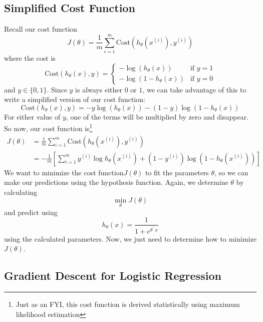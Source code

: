 \subsection{Simplified Cost Function}
Recall our cost function 
\begin{equation}
J\left(\theta\right) = \frac{1}{m} \sum_{i=1}^m \text{Cost}\left(	h_\theta\left(x^{\left(i\right)}\right), y^{\left(i\right)}\right)
\end{equation}
where the cost is 
\begin{equation}
\text{Cost}\left(h_\theta\left(x\right), y\right) = \begin{cases} -\log\left(h_\theta\left(x\right)\right) & \text{if } y = 1 \\ -\log\left(1 - h_\theta\left(x\right)\right) &\text{if } y = 0
\end{cases}
\end{equation}
and $y \in \{0, 1\}$. 
Since $y$ is always either $0$ or $1$, we can take advantage of this to write a simplified version of our cost function:
\begin{equation}
\text{Cost}\left(h_\theta\left(x\right), y\right) = -y\log\left(h_\theta\left(x\right)\right) - \left( 1-y \right) \log\left(1 - h_\theta\left(x\right)\right)
\end{equation}
For either value of $y$, one of the terms will be multiplied by zero and disappear. So now, our cost function is\footnote{Just as an FYI, this cost function is derived statistically using maximum likelihood estimation}
\begin{align}
J\left(\theta\right) &= \frac{1}{m} \sum_{i=1}^m \text{Cost}\left(	h_\theta\left(x^{\left(i\right)}\right), y^{\left(i\right)}\right) \nonumber \\
\label{chaplogreg-sectsimpcostfunct-simpcostfuncformula}
&= -\frac{1}{m} \left[ \sum_{i=1}^m y^{\left(i\right)} \log h_\theta\left(x^{\left(i\right)}\right) + \left(1 - y^{\left(i\right)}\right) \log \left(1 - h_\theta\left(x^{\left(i\right)}\right)\right)\right]
\end{align}
We want to minimize the cost function$J\left(\theta\right)$ to fit the parameters $\theta$, so we can make our predictions using the hypothesis function. Again, we determine $\theta$ by calculating 
$$
\min_\theta J\left(\theta\right) 
$$
and predict using 
$$
h_\theta\left(x\right) = \frac{1}{1 + e^{\theta^{{}^\intercal}x}}
$$
using the calculated parameters. Now, we just need to determine how to minimize $J\left(\theta\right)$. 

\subsection{Gradient Descent for Logistic Regression}

